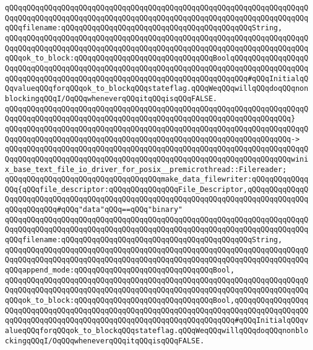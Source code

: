 \verb|qQQqqQQqqQQqqQQqqQQqqQQqqQQqqQQqqQQqqQQqqQQqqQQqqQQqqQQqqQQqqQQqqQQqqQQqqQQqqQQqqQQqqQQqqQQqqQQqqQQqqQQqqQQqqQQqqQQqqQQqqQQqqQQqqQQqqQQqqQQqqQQqfilename:qQQqqQQqqQQqqQQqqQQqqQQqqQQqqQQqqQQqqQQqqQQqString,|\newline
\verb|qQQqqQQqqQQqqQQqqQQqqQQqqQQqqQQqqQQqqQQqqQQqqQQqqQQqqQQqqQQqqQQqqQQqqQQqqQQqqQQqqQQqqQQqqQQqqQQqqQQqqQQqqQQqqQQqqQQqqQQqqQQqqQQqqQQqqQQqqQQqqQQqok_to_block:qQQqqQQqqQQqqQQqqQQqqQQqqQQqqQQqBoolqQQqqQQqqQQqqQQqqQQqqQQqqQQqqQQqqQQqqQQqqQQqqQQqqQQqqQQqqQQqqQQqqQQqqQQqqQQqqQQqqQQqqQQqqQQqqQQqqQQqqQQqqQQqqQQqqQQqqQQqqQQqqQQqqQQqqQQqqQQqqQQq#qQQqInitialqQQqvalueqQQqforqQQqok_to_blockqQQqstateflag.qQQqWeqQQqwillqQQqdoqQQqnonblockingqQQqI/OqQQqwheneverqQQqitqQQqisqQQqFALSE.|\newline
\verb|qQQqqQQqqQQqqQQqqQQqqQQqqQQqqQQqqQQqqQQqqQQqqQQqqQQqqQQqqQQqqQQqqQQqqQQqqQQqqQQqqQQqqQQqqQQqqQQqqQQqqQQqqQQqqQQqqQQqqQQqqQQqqQQqqQQqqQQq}|\newline
\verb|qQQqqQQqqQQqqQQqqQQqqQQqqQQqqQQqqQQqqQQqqQQqqQQqqQQqqQQqqQQqqQQqqQQqqQQqqQQqqQQqqQQqqQQqqQQqqQQqqQQqqQQqqQQqqQQqqQQqqQQqqQQqqQQqqQQqqQQq->|\newline
\verb|qQQqqQQqqQQqqQQqqQQqqQQqqQQqqQQqqQQqqQQqqQQqqQQqqQQqqQQqqQQqqQQqqQQqqQQqqQQqqQQqqQQqqQQqqQQqqQQqqQQqqQQqqQQqqQQqqQQqqQQqqQQqqQQqqQQqqQQqwinix_base_text_file_io_driver_for_posix__premicrothread::Filereader;|\newline
\newline
\verb|qQQqqQQqqQQqqQQqqQQqqQQqqQQqqQQqqQQqmake_data_filewriter:qQQqqQQqqQQqqQQq{qQQqfile_descriptor:qQQqqQQqqQQqqQQqFile_Descriptor,qQQqqQQqqQQqqQQqqQQqqQQqqQQqqQQqqQQqqQQqqQQqqQQqqQQqqQQqqQQqqQQqqQQqqQQqqQQqqQQqqQQqqQQqqQQqqQQq#qQQq"data"qQQq==qQQq"binary"|\newline
\verb|qQQqqQQqqQQqqQQqqQQqqQQqqQQqqQQqqQQqqQQqqQQqqQQqqQQqqQQqqQQqqQQqqQQqqQQqqQQqqQQqqQQqqQQqqQQqqQQqqQQqqQQqqQQqqQQqqQQqqQQqqQQqqQQqqQQqqQQqqQQqqQQqfilename:qQQqqQQqqQQqqQQqqQQqqQQqqQQqqQQqqQQqqQQqqQQqString,|\newline
\verb|qQQqqQQqqQQqqQQqqQQqqQQqqQQqqQQqqQQqqQQqqQQqqQQqqQQqqQQqqQQqqQQqqQQqqQQqqQQqqQQqqQQqqQQqqQQqqQQqqQQqqQQqqQQqqQQqqQQqqQQqqQQqqQQqqQQqqQQqqQQqqQQqappend_mode:qQQqqQQqqQQqqQQqqQQqqQQqqQQqqQQqBool,|\newline
\verb|qQQqqQQqqQQqqQQqqQQqqQQqqQQqqQQqqQQqqQQqqQQqqQQqqQQqqQQqqQQqqQQqqQQqqQQqqQQqqQQqqQQqqQQqqQQqqQQqqQQqqQQqqQQqqQQqqQQqqQQqqQQqqQQqqQQqqQQqqQQqqQQqok_to_block:qQQqqQQqqQQqqQQqqQQqqQQqqQQqqQQqBool,qQQqqQQqqQQqqQQqqQQqqQQqqQQqqQQqqQQqqQQqqQQqqQQqqQQqqQQqqQQqqQQqqQQqqQQqqQQqqQQqqQQqqQQqqQQqqQQqqQQqqQQqqQQqqQQqqQQqqQQqqQQqqQQqqQQqqQQqqQQq#qQQqInitialqQQqvalueqQQqforqQQqok_to_blockqQQqstateflag.qQQqWeqQQqwillqQQqdoqQQqnonblockingqQQqI/OqQQqwheneverqQQqitqQQqisqQQqFALSE.|\newline
